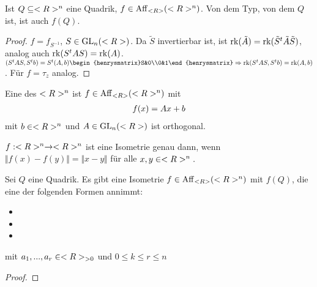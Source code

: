 \begin{lemma}
	Ist $Q\subseteq<R>^n$ eine Quadrik, $f\in\operatorname{Aff}_{<R>}(<R>^n)$. Von dem Typ, von dem $Q$ ist, ist auch $f(Q)$.
\end{lemma}
\begin{proof}
	$f=f_{S^{-1}}$, $S\in\operatorname{GL}_n(<R>)$. Da $\tilde{S}$ invertierbar ist, ist $\operatorname{rk}(\tilde{A})= \operatorname{rk}(\tilde{S}^t\tilde{A}\tilde{S})$, analog auch $\operatorname{rk}(S^tAS)=\operatorname{rk}(A)$. \\
	$(S^tAS,S^tb)=S^t(A,b)\begin{henrysmatrix}S&0\\0&1\end{henrysmatrix}\Rightarrow \rk(S^tAS,S^tb)=\rk(A,b)$. Für $f=\tau_z$ analog.
\end{proof}

\begin{definition}[Isometrie]
	Eine  des $<R>^n$ ist $f\in\operatorname{Aff}_{<R>}(<R>^n)$ mit
	\begin{align}
		f(x)=Ax+b\notag
	\end{align}
	mit $b\in<R>^n$ und $A\in\operatorname{GL}_n(<R>)$ ist orthogonal.
\end{definition}

\begin{remark}
	$f:<R>^n\to<R>^n$ ist eine Isometrie genau dann, wenn $\Vert f(x)-f(y)\Vert=\Vert x-y\Vert$ für alle $x,y\in<R>^n.$
\end{remark}

\begin{theorem}
	Sei $Q$ eine Quadrik. Es gibt eine Isometrie $f\in\operatorname{Aff}_{<R>}(<R>^n)$ mit $f(Q)$, die eine der folgenden Formen annimmt:
	\begin{itemize}
		\item {}
		\item {}
		\item {}
	\end{itemize}
	mit $a_1,...,a_r\in<R>_{>0}$ und $0\le k\le r\le n$
\end{theorem}
\begin{proof}
	
\end{proof}

